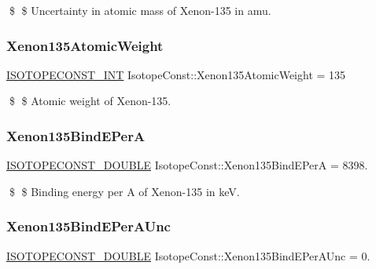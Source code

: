 \$ \$ Uncertainty in atomic mass of Xenon-\/135 in amu. \mbox{\label{group___isotope_const-_xenon-_xe135_ga25cb3cc117ae4d519b9257c1b5f4fdcf}} 
\subsubsection{\texorpdfstring{Xenon135\+Atomic\+Weight}{Xenon135AtomicWeight}}
{\footnotesize\ttfamily \mbox{\hyperlink{group___isotope_const-_macros_ga5f18360b3e99483a35c32d789e62621c}{I\+S\+O\+T\+O\+P\+E\+C\+O\+N\+S\+T\+\_\+\+I\+NT}} Isotope\+Const\+::\+Xenon135\+Atomic\+Weight = 135}

\$ \$ Atomic weight of Xenon-\/135. \mbox{\label{group___isotope_const-_xenon-_xe135_ga940f7160cbb121a2d3fd6e32966a10f4}} 
\subsubsection{\texorpdfstring{Xenon135\+Bind\+E\+PerA}{Xenon135BindEPerA}}
{\footnotesize\ttfamily \mbox{\hyperlink{group___isotope_const-_macros_ga8f45a7272ce02c0b4c65c44636ed719a}{I\+S\+O\+T\+O\+P\+E\+C\+O\+N\+S\+T\+\_\+\+D\+O\+U\+B\+LE}} Isotope\+Const\+::\+Xenon135\+Bind\+E\+PerA = 8398.}

\$ \$ Binding energy per A of Xenon-\/135 in keV. \mbox{\label{group___isotope_const-_xenon-_xe135_ga7ac8bc8d70900f6d57631d7c099919c4}} 
\subsubsection{\texorpdfstring{Xenon135\+Bind\+E\+Per\+A\+Unc}{Xenon135BindEPerAUnc}}
{\footnotesize\ttfamily \mbox{\hyperlink{group___isotope_const-_macros_ga8f45a7272ce02c0b4c65c44636ed719a}{I\+S\+O\+T\+O\+P\+E\+C\+O\+N\+S\+T\+\_\+\+D\+O\+U\+B\+LE}} Isotope\+Const\+::\+Xenon135\+Bind\+E\+Per\+A\+Unc = 0.}

